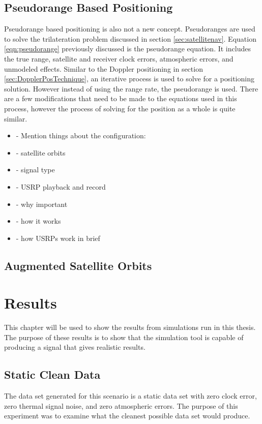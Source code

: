 \documentclass[12pt]{report}
\begin{document}
\section{Pseudorange Based Positioning} \label{sec:PseudorangePosTechnique}
Pseudorange based positioning is also not a new concept. Pseudoranges are used to solve the trilateration problem discussed in section \ref{sec:satellitenav}. Equation \ref{eqn:pseudorange} previously discussed is the pseudorange equation. It includes the true range, satellite and receiver clock errors, atmospheric errors, and unmodeled effects. Similar to the Doppler positioning in section \ref{sec:DopplerPosTechnique}, an iterative process is used to solve for a positioning solution. However instead of using the range rate, the pseudorange is used. There are a few modifications that need to be made to the equations used in this process, however the process of solving for the position as a whole is quite similar. 
\begin{itemize}
    \item     - Mention things about the configuration:
    \item     - satellite orbits
    \item     - signal type
    \item     - USRP playback and record
    \item     - why important
    \item     - how it works
    \item     - how USRPs work in brief

\end{itemize}

\section{Augmented Satellite Orbits}

\chapter{Results}

This chapter will be used to show the results from simulations run in this thesis. The purpose of these results is to show that the simulation tool is capable of producing a signal that gives realistic results. 

\section{Static Clean Data}
The data set generated for this scenario is a static data set with zero clock error, zero thermal signal noise, and zero atmospheric errors. The purpose of this experiment was to examine what the cleanest possible data set would produce.  
\end{document}
